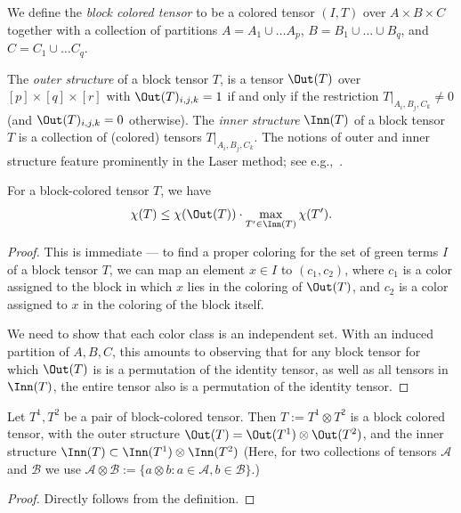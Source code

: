 We define the \emph{block colored tensor} to be a colored tensor $(I, T)$ over $A \times B \times C$ together with a collection of partitions $A = A_1 \cup \ldots A_p$, $B = B_1 \cup \ldots \cup B_q$, and $C = C_1 \cup \ldots C_q$.

The \emph{outer structure} of a block tensor $T$, is a tensor $\Out(T)$ over $[p] \times [q] \times [r]$ with $
\Out(T)_{i,j,k} = 1$ if and only if the restriction $T|_{A_i, B_j, C_k} \not= 0$ (and $\Out(T)_{i,j,k} = 0$ otherwise). The \emph{inner structure} $\Inn(T)$ of a block tensor $T$ is a collection of (colored) tensors $T|_{A_i, B_j, C_k}$. The notions of outer and inner structure feature prominently in the Laser method; see e.g.,~\cite[Section 8]{B13}.

\begin{lemma}
\label{lem:block-coloring}
For a block-colored tensor $T$, we have
\begin{equation*}
    \chi(T) \leq \chi(\Out(T)) \cdot \max_{T' \in \Inn(T)} \chi(T').
\end{equation*}
\end{lemma}
\begin{proof}
    This is immediate --- to find a proper coloring for the set of green terms $I$ of a block tensor $T$, we can map an element $x \in I$ to $(c_1, c_2)$, where $c_1$ is a color assigned to the block in which $x$ lies in the coloring of $\Out(T)$, and $c_2$ is a color assigned to $x$ in the coloring of the block itself.

    We need to show that each color class is an independent set. With an induced partition of $A, B, C$, this amounts to observing that for any block tensor for which $\Out(T)$ is is a permutation of the identity tensor, as well as all tensors in $\Inn(T)$, the entire tensor also is a permutation of the identity tensor. 
\end{proof}

\begin{fact}
\label{fct:block-product}
Let $T^1, T^2$ be a pair of block-colored tensor. Then $T := T^1 \otimes T^2$ is a block colored tensor, with the outer structure $\Out(T) = \Out(T^1) \otimes \Out(T^2)$, and the inner structure $\Inn(T) \subset \Inn(T^1) \otimes \Inn(T^2)$ (Here, for two collections of tensors $\mathcal{A}$ and $\mathcal{B}$ we use $\mathcal{A} \otimes \mathcal{B} := \{ a \otimes b : a \in \mathcal{A}, b\in \mathcal{B}\}$.)
\end{fact}
\begin{proof}
    Directly follows from the definition.
\end{proof}

